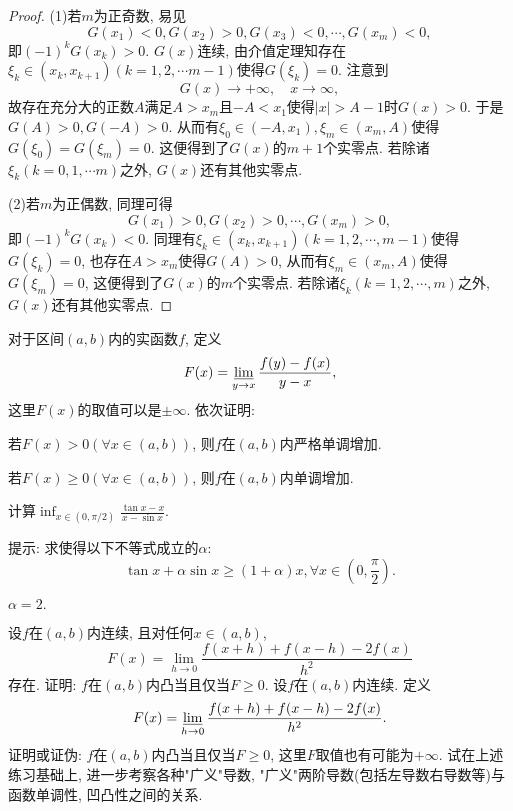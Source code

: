 \begin{quizb}
\begin{proof}
(1)若\(m\)为正奇数, 易见\[G(x_1)<0,G(x_2)>0,G(x_3)<0,\cdots,G(x_m)<0,\]即\((-1)^kG(x_k)>0\). \(G(x)\)连续, 由介值定理知存在\(\xi_k\in(x_k,x_{k+1})(k=1,2,\cdots m-1)\)使得\(G(\xi_k)=0\). 注意到\[G(x)\rightarrow+\infty,\quad x\rightarrow\infty,\]故存在充分大的正数\(A\)满足\(A>x_m\)且\(-A<x_1\)使得\(|x|>A-1\)时\(G(x)> 0\). 于是\(G(A)>0,G(-A)>0\). 从而有\(\xi_0\in(-A,x_1),\xi_m\in(x_m,A)\)使得\(G(\xi_0)=G(\xi_m)=0\). 这便得到了\(G(x)\)的\(m+1\)个实零点. 若除诸\(\xi_k(k=0,1,\cdots m)\)之外, \(G(x)\)还有其他实零点.

(2)若\(m\)为正偶数, 同理可得\[G(x_1)>0,G(x_2)>0,\cdots,G(x_m)>0,\]即\((-1)^{k}G(x_k)<0\). 同理有\(\xi_k\in(x_k,x_{k+1})(k=1,2,\cdots,m-1)\)使得\(G(\xi_k)=0\), 也存在\(A>x_m\)使得\(G(A)>0\), 从而有\(\xi_m\in(x_m,A)\)使得\(G(\xi_m)=0\), 这便得到了\(G(x)\)的\(m\)个实零点. 若除诸\(\xi_k(k=1,2,\cdots,m)\)之外, \(G(x)\)还有其他实零点.
\end{proof}
\woe 对于区间\((a,b)\)内的实函数\(f\), 定义\[F(x)=\varliminf_{y\rightarrow x}\frac{f(y)-f(x)}{y-x},\]这里\(F(x)\)的取值可以是\(\pm\infty\). 依次证明:\begin{quizs}
\item 若\(F(x)>0(\forall x\in(a,b))\), 则\(f\)在\((a,b)\)内严格单调增加.
\item 若\(F(x)\geqslant 0(\forall x\in(a,b))\), 则\(f\)在\((a,b)\)内单调增加.
\end{quizs}
\woe 计算\(\inf_{x\in\left(0,\pi/2\right)}\frac{\tan x-x}{x-\sin x}\).

提示: 求使得以下不等式成立的\(\alpha\):\[\tan x+\alpha\sin x\geqslant (1+\alpha)x,\forall x\in\left(0,\frac{\pi}{2}\right).\]
\begin{solution}
\(\alpha=2.\)
\end{solution}
\woe 设\(f\)在\((a,b)\)内连续, 且对任何\(x\in(a,b)\),\[F(x)=\lim_{h\rightarrow 0}\frac{f(x+h)+f(x-h)-2f(x)}{h^2}\]存在. 证明: \(f\)在\((a,b)\)内凸当且仅当\(F\geqslant 0\).
\woe 设\(f\)在\((a,b)\)内连续. 定义\[F(x)=\varliminf_{h\rightarrow 0}\frac{f(x+h)+f(x-h)-2f(x)}{h^2}.\]证明或证伪: \(f\)在\((a,b)\)内凸当且仅当\(F\geqslant 0\), 这里\(F\)取值也有可能为\(+\infty\).
\woe 试在上述练习基础上, 进一步考察各种"广义"导数, "广义"两阶导数(包括左导数右导数等)与函数单调性, 凹凸性之间的关系.
\end{quizb}
